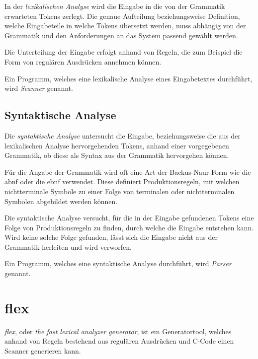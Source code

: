 \documentclass[oneside]{ausarbeitung}
\begin{document}
In der \textit{lexikalischen Analyse} wird die Eingabe in die von der Grammatik erwarteten Tokens zerlegt. Die genaue Aufteilung beziehungsweise Definition, welche Eingabeteile in welche Tokens übersetzt werden, muss abhängig von der Grammatik und den Anforderungen an das System passend gewählt werden.\cite{Herold:lexYacc} \cite{Bantel:compilerbau}
	
Die Unterteilung der Eingabe erfolgt anhand von Regeln, die zum Beispiel die Form von regulären Ausdrücken annehmen können. 

Ein Programm, welches eine lexikalische Analyse eines Eingabetextes durchführt, wird \textit{Scanner} genannt.
	 
	
\subsection{Syntaktische Analyse}
	
Die \textit{syntaktische Analyse} untersucht die Eingabe, beziehungsweise die aus der lexikalischen Analyse hervorgehenden Tokens, anhand einer vorgegebenen Grammatik, ob diese als Syntax aus der Grammatik hervorgehen können. \cite{Herold:lexYacc} \cite{Bantel:compilerbau}
	
Für die Angabe der Grammatik wird oft eine Art der Backus-Naur-Form wie die \ac{abnf} oder die {ebnf} verwendet. Diese definiert Produktionsregeln, mit welchen nichtterminale Symbole zu einer Folge von terminalen oder nichtterminalen Symbolen abgebildet werden können. 
	
Die syntaktische Analyse versucht, für die in der Eingabe gefundenen Tokens eine Folge von Produktionsregeln zu finden, durch welche die Eingabe entstehen kann. Wird keine solche Folge gefunden, lässt sich die Eingabe nicht aus der Grammatik herleiten und wird verworfen.

Ein Programm, welches eine syntaktische Analyse durchführt, wird \textit{Parser} genannt.
	
	


\pagebreak

\section{flex}
	
\textit{flex}, oder \textit{the fast lexical analyzer generator}, ist ein Generatortool, welches anhand von Regeln bestehend aus regulären Ausdrücken und C-Code einen Scanner generieren kann.  \cite{Estes:flex} \cite{Paxson:flex}
\end{document}
